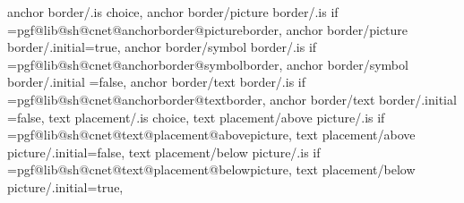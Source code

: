 {  %
  anchor border/.is choice,%
  anchor border/picture border/.is if  =pgf@lib@sh@cnet@anchorborder@pictureborder,%
  anchor border/picture border/.initial=true,%
  anchor border/symbol border/.is if   =pgf@lib@sh@cnet@anchorborder@symbolborder,%
  anchor border/symbol border/.initial =false,%
  anchor border/text border/.is if     =pgf@lib@sh@cnet@anchorborder@textborder,%
  anchor border/text border/.initial   =false,%
  text placement/.is choice,%
  text placement/above picture/.is if  =pgf@lib@sh@cnet@text@placement@abovepicture,%
  text placement/above picture/.initial=false,%
  text placement/below picture/.is if  =pgf@lib@sh@cnet@text@placement@belowpicture,%
  text placement/below picture/.initial=true,%
}%


\newif\ifpgf@lib@sh@cnet@text@placement@abovepicture%
\newif\ifpgf@lib@sh@cnet@text@placement@belowpicture%
\newif\ifpgf@lib@sh@cnet@anchorborder@symbolborder%
\newif\ifpgf@lib@sh@cnet@anchorborder@pictureborder%
\newif\ifpgf@lib@sh@cnet@anchorborder@textborder%

\def\pgf@lib@sh@cnet@nonetext{none}%

%
%

\def\pgf@lib@sh@cnet@append#1#2{%
  \expandafter\def\expandafter#1\expandafter{#1#2}}%

\def\pgf@lib@sh@cnet@addoption#1#2{\pgf@lib@sh@cnet@append{#1}{#2}}%

\def\pgf@lib@sh@cnet@addmode#1#2{\pgf@lib@sh@cnet@append{#1}{#2}}%

\def\pgf@lib@sh@cnet@picture@outline@addoption#1{\pgf@lib@sh@cnet@addoption{\pgf@lib@sh@cnet@picture@outline@options}{#1}}%
\let\pgf@lib@sh@cnet@picture@outline@options\pgfutil@empty%

